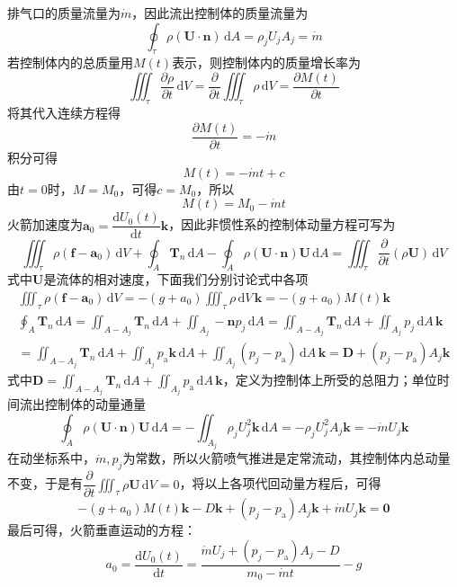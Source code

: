 排气口的质量流量为$\dot{m}$，因此流出控制体的质量流量为
\[
\oint_\tau \rho(\boldsymbol{U}\cdot\boldsymbol{n})\,\mathrm{d}A=\rho_j U_j A_j=\dot{m}
\]
若控制体内的总质量用$M(t)$表示，则控制体内的质量增长率为
\[
\iiint_\tau \frac{\partial\rho}{\partial t}\,\mathrm{d}V=\frac{\partial}{\partial t}\iiint_\tau \rho\,\mathrm{d}V=\frac{\partial M(t)}{\partial t}
\]
将其代入连续方程得
\[
\frac{\partial M(t)}{\partial t}=-\dot{m}
\]
积分可得
\[
M(t)=-\dot{m}t+c
\]
由$t=0$时，$M=M_0$，可得$c=M_0$，所以
\[
M(t)=M_0-\dot{m}t
\]
火箭加速度为$\boldsymbol{a}_0=\dfrac{\mathrm{d}U_0(t)}{\mathrm{d}t}\boldsymbol{k}$，因此非惯性系的控制体动量方程可写为
\[
\iiint_\tau \rho(\boldsymbol{f}-\boldsymbol{a}_0)\,\mathrm{d}V+\oint_A \boldsymbol{T}_n\,\mathrm{d}A-\oint_A \rho(\boldsymbol{U}\cdot\boldsymbol{n})\boldsymbol{U}\,\mathrm{d}A=\iiint_\tau \frac{\partial}{\partial t}(\rho\boldsymbol{U})\,\mathrm{d}V
\]
式中$\boldsymbol{U}$是流体的相对速度，下面我们分别讨论式中各项
\begin{gather*}
\iiint_\tau \rho(\boldsymbol{f}-\boldsymbol{a}_0)\,\mathrm{d}V=-(g+a_0)\iiint_\tau \rho\,\mathrm{d}V\,\boldsymbol{k}=-(g+a_0)M(t)\boldsymbol{k}\\[2pt]
\oint_A \boldsymbol{T}_n\,\mathrm{d}A=\iint_{A-A_j}\boldsymbol{T}_n\,\mathrm{d}A+\iint_{A_j}-\boldsymbol{n}p_j\,\mathrm{d}A=\iint_{A-A_j}\boldsymbol{T}_n\,\mathrm{d}A+\iint_{A_j}p_j\,\mathrm{d}A\,\boldsymbol{k}\\[2pt]
=\iint_{A-A_j}\boldsymbol{T}_n\,\mathrm{d}A+\iint_{A_j}p_{\mathrm{a}}\boldsymbol{k}\,\mathrm{d}A+\iint_{A_j}(p_j-p_{\mathrm{a}})\,\mathrm{d}A\,\boldsymbol{k}=\boldsymbol{D}+(p_j-p_{\mathrm{a}})A_j\boldsymbol{k}
\end{gather*}
式中$\boldsymbol{D}=\displaystyle\iint_{A-A_j}\boldsymbol{T}_n\,\mathrm{d}A+\iint_{A_j}p_{\mathrm{a}}\,\mathrm{d}A\,\boldsymbol{k}$，定义为控制体上所受的总阻力；单位时间流出控制体的动量通量
\[
\oint_A \rho(\boldsymbol{U}\cdot\boldsymbol{n})\boldsymbol{U}\,\mathrm{d}A=-\iint_{A_j}\rho_j U_j^{2}\boldsymbol{k}\,\mathrm{d}A=-\rho_j U_j^{2}A_j\boldsymbol{k}=-\dot{m}U_j\boldsymbol{k}
\]
在动坐标系中，$\dot{m},p_j$为常数，所以火箭喷气推进是定常流动，其控制体内总动量不变，于是有$\dfrac{\partial}{\partial t}\displaystyle\iiint_\tau \rho\boldsymbol{U}\,\mathrm{d}V=0$，将以上各项代回动量方程后，可得
\[
-(g+a_0)M(t)\boldsymbol{k}-D\boldsymbol{k}+(p_j-p_{\mathrm{a}})A_j\boldsymbol{k}+\dot{m}U_j\boldsymbol{k}=\boldsymbol{0}
\]
最后可得，火箭垂直运动的方程：
\[
a_0=\frac{\mathrm{d}U_0(t)}{\mathrm{d}t}=\frac{\dot{m}U_j+(p_j-p_{\mathrm{a}})A_j-D}{m_0-\dot{m}t}-g
\]

